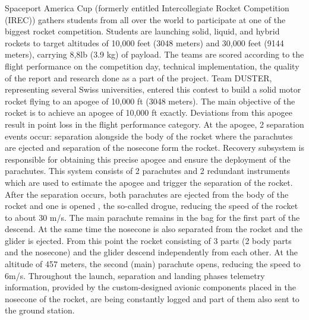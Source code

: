 \documentclass[]{iac}
\begin{document}
Spaceport America Cup (formerly entitled Intercollegiate Rocket Competition (IREC)) gathers students from all over the world to participate at one of the biggest rocket competition. Students are launching solid, liquid, and hybrid rockets to target altitudes of 10,000 feet (3048 meters) and 30,000 feet (9144 meters), carrying 8,8lb (3.9 kg) of payload. The teams are scored according to the flight performance on the competition day, technical implementation, the quality of the report and research done as a part of the project.
Team DUSTER, representing several Swiss universities, entered this contest to build a solid motor rocket flying to an apogee of 10,000 ft (3048 meters). 
The main objective of the rocket is to achieve an apogee of 10,000 ft exactly. Deviations from this apogee result in point loss in the flight performance category. At the apogee, 2 separation events occur: separation alongside the body of the rocket where the parachutes are ejected and separation of the nosecone form the rocket. 
Recovery subsystem is responsible for obtaining this precise apogee and ensure the deployment of the parachutes. This system consists of 2 parachutes and 2 redundant instruments which are used to estimate the apogee and trigger the separation of the rocket. After the separation occurs, both parachutes are ejected from the body of the rocket and one is opened , the so-called drogue, reducing the speed of the rocket to about 30 m/s. The main parachute remains in the bag for the first part of the descend. At the same time the nosecone is also separated from the rocket and the glider is ejected. From this point the rocket consisting of 3 parts (2 body parts and the nosecone) and the glider descend independently from each other. At the altitude of 457 meters, the second (main) parachute opens, reducing the speed to 6m/s. Throughout the launch, separation and landing phases telemetry information, provided by the custom-designed avionic components placed in the nosecone of the rocket, are being constantly logged and part of them also sent to the ground station. 
\end{document}

